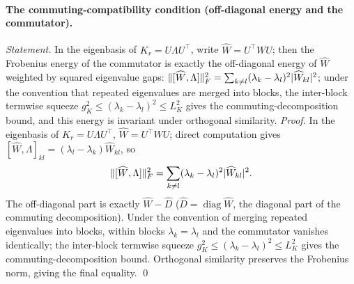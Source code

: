 \documentclass[11pt]{article}
\DeclarePairedDelimiter{\norm}{\lVert}{\rVert}
\newcommand{\W}{W}
\DeclareMathOperator{\diag}{diag}
\numberwithin{equation}{section}
\begin{document}
\paragraph{The commuting-compatibility condition (off-diagonal energy and the commutator).}
\emph{Statement.} In the eigenbasis of $K_r=U\Lambda U^\top$, write $\widehat\W=U^\top\W U$; then the Frobenius energy of the commutator is exactly the off-diagonal energy of $\widehat\W$ weighted by squared eigenvalue gaps: $\norm{[\widehat\W,\Lambda]}_F^2=\sum_{k\ne l}(\lambda_k-\lambda_l)^2|\widehat\W_{kl}|^2$; under the convention that repeated eigenvalues are merged into blocks, the inter-block termwise squeeze $g_K^2\le(\lambda_k-\lambda_l)^2\le L_K^2$ gives the commuting-decomposition bound, and this energy is invariant under orthogonal similarity.
\emph{Proof.} In the eigenbasis of $K_r=U\Lambda U^\top$, $\widehat\W=U^\top\W U$; direct computation gives $[\widehat\W,\Lambda]_{kl}=(\lambda_l-\lambda_k)\widehat\W_{kl}$, so
\[
\norm{[\widehat\W,\Lambda]}_F^2=\sum_{k\ne l}(\lambda_k-\lambda_l)^2|\widehat\W_{kl}|^2.
\]
The off-diagonal part is exactly $\widehat\W-\widehat D$ ($\widehat D=\diag\widehat\W$, the diagonal part of the commuting decomposition). Under the convention of merging repeated eigenvalues into blocks, within blocks $\lambda_k=\lambda_l$ and the commutator vanishes identically; the inter-block termwise squeeze $g_K^2\le(\lambda_k-\lambda_l)^2\le L_K^2$ gives the commuting-decomposition bound. Orthogonal similarity preserves the Frobenius norm, giving the final equality. \qed
\end{document}
